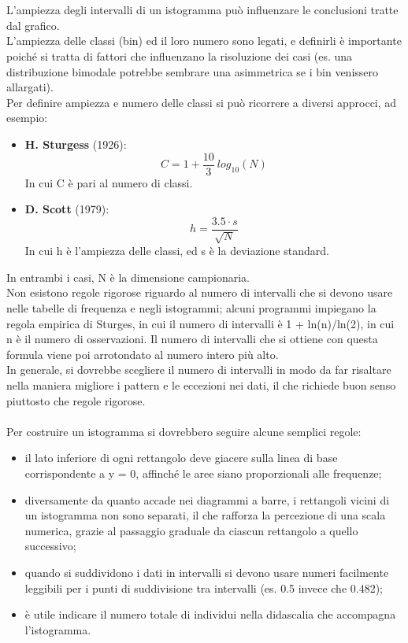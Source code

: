 \documentclass[drafts, 10pt]{book}
\begin{document}
\\
\\
L'ampiezza degli intervalli di un istogramma può influenzare le conclusioni tratte dal grafico.
\\
L’ampiezza delle classi (bin) ed il loro numero sono legati, e definirli è importante poiché si tratta di fattori che influenzano la risoluzione dei casi (es. una distribuzione bimodale potrebbe sembrare una asimmetrica se i bin venissero allargati).
\\
Per definire ampiezza e numero delle classi si può ricorrere a diversi approcci, ad esempio:
\begin{itemize}
    \item \textbf{H. Sturgess} (1926):
    \begin{equation}
        C = 1 + \frac{10}{3}\ log_{10}(N)
    \end{equation}
    In cui C è pari al numero di classi.
    \item \textbf{D. Scott} (1979):
    \begin{equation}
        h = \frac{3.5 \cdot s}{\sqrt{N}}
    \end{equation}
    In cui h è l'ampiezza delle classi, ed s è la deviazione standard.
\end{itemize}
In entrambi i casi, N è la dimensione campionaria.
\\
Non esistono regole rigorose riguardo al numero di intervalli che si devono usare nelle tabelle di frequenza e negli istogrammi; alcuni programmi impiegano la regola empirica di Sturges, in cui il numero di intervalli è 1 + ln(n)/ln(2), in cui n è il numero di osservazioni. Il numero di intervalli che si ottiene con questa formula viene poi arrotondato al numero intero più alto. 
\\
In generale, si dovrebbe scegliere il numero di intervalli in modo da far risaltare nella maniera migliore i pattern e le eccezioni nei dati, il che richiede buon senso piuttosto che regole rigorose.
\\
\\
Per costruire un istogramma si dovrebbero seguire alcune semplici regole:
\begin{itemize}
    \item il lato inferiore di ogni rettangolo deve giacere sulla linea di base corrispondente a y = 0, affinché le aree siano proporzionali alle frequenze;
    \item diversamente da quanto accade nei diagrammi a barre, i rettangoli vicini di un istogramma non sono separati, il che rafforza la percezione di una scala numerica, grazie al passaggio graduale da ciascun rettangolo a quello successivo;
    \item quando si suddividono i dati in intervalli si devono usare numeri facilmente leggibili per i punti di suddivisione tra intervalli (es. 0.5 invece che 0.482);
    \item è utile indicare il numero totale di individui nella didascalia che accompagna l'istogramma.
\end{itemize}
\end{document}
